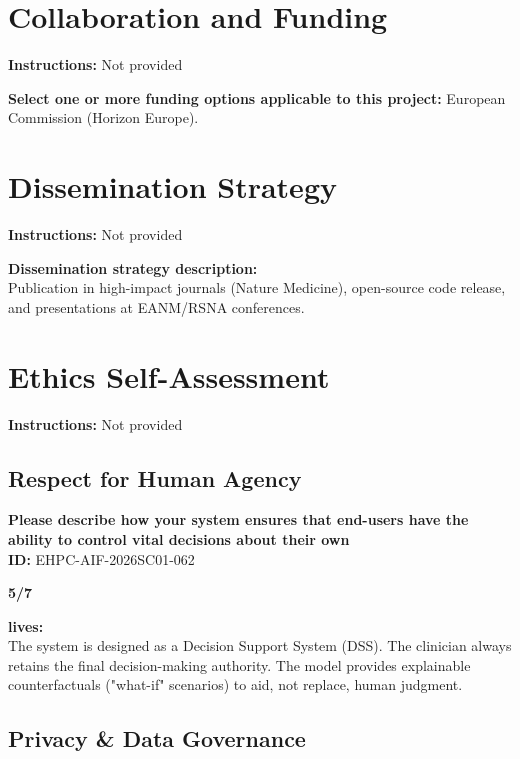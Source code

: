 \documentclass[11pt, a4paper]{article}
\begin{document}
\section*{Collaboration and Funding}

\noindent\textbf{Instructions:} Not provided

\vspace{0.5em}
\noindent\textbf{Select one or more funding options applicable to this project:} European Commission (Horizon Europe).

\section*{Dissemination Strategy}

\noindent\textbf{Instructions:} Not provided

\vspace{0.5em}
\noindent\textbf{Dissemination strategy description:} \\
Publication in high-impact journals (Nature Medicine), open-source code release, and presentations at EANM/RSNA conferences.

\section*{Ethics Self-Assessment}

\noindent\textbf{Instructions:} Not provided

\subsection*{Respect for Human Agency}

\noindent\textbf{Please describe how your system ensures that end-users have the ability to control vital decisions about their own} \\
\textbf{ID:} EHPC-AIF-2026SC01-062

\vspace{0.5em}
\noindent\textbf{5/7}

\noindent\textbf{lives:} \\
The system is designed as a Decision Support System (DSS). The clinician always retains the final decision-making authority. The model provides explainable counterfactuals ("what-if" scenarios) to aid, not replace, human judgment.

\subsection*{Privacy \& Data Governance}
\end{document}
